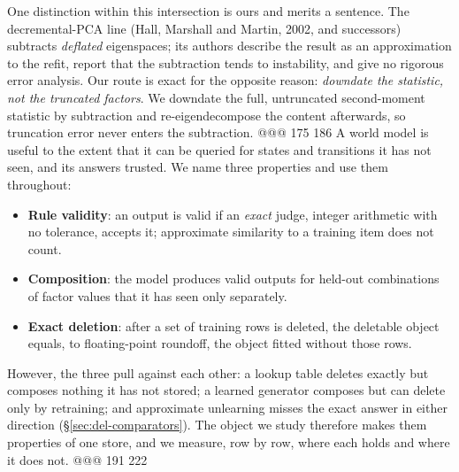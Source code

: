 One distinction within this intersection is ours and merits a sentence. The decremental-PCA
line (Hall, Marshall and Martin, 2002, and successors) subtracts \emph{deflated} eigenspaces;
its authors describe the result as an approximation to the refit, report that the subtraction
tends to instability, and give no rigorous error analysis. Our route is exact for the opposite
reason: \emph{downdate the statistic, not the truncated factors}. We downdate the full,
untruncated second-moment statistic by subtraction and re-eigendecompose the content
afterwards, so truncation error never enters the subtraction.
@@@ 175 186
A world model is useful to the extent that it can be queried for states and transitions it has
not seen, and its answers trusted. We name three properties and use them throughout:
\begin{itemize}[leftmargin=*,nosep]
\item \textbf{Rule validity}: an output is valid if an \emph{exact} judge, integer arithmetic
  with no tolerance, accepts it; approximate similarity to a training item does not count.
\item \textbf{Composition}: the model produces valid outputs for held-out combinations of
  factor values that it has seen only separately.
\item \textbf{Exact deletion}: after a set of training rows is deleted, the deletable object
  equals, to floating-point roundoff, the object fitted without those rows.
\end{itemize}
However, the three pull against each other: a lookup table deletes exactly but
composes nothing it has not stored; a learned generator composes but can delete only by
retraining; and approximate unlearning misses the exact answer in either direction
(\S\ref{sec:del-comparators}). The object we study therefore makes them properties of one store, and we measure, row by row, where each holds and where it does not.
@@@ 191 222
